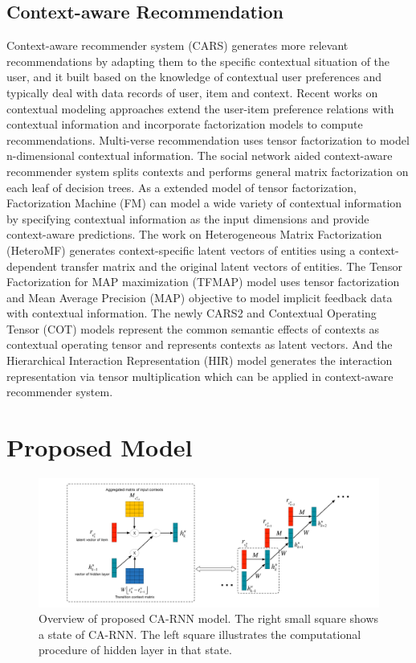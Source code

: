 \documentclass[conference]{IEEEtran}
\begin{document}
\subsection{Context-aware Recommendation}
Context-aware recommender system (CARS) \cite{adomavicius2011context} generates more relevant recommendations by adapting them to the specific contextual situation of the user, and it built based on the knowledge of contextual user preferences and typically deal with data records of user, item and context. Recent works on contextual modeling approaches extend the user-item preference relations with contextual information and incorporate factorization models to compute recommendations. Multi-verse recommendation \cite{karatzoglou2010multiverse} uses tensor factorization to model n-dimensional contextual information. The social network aided context-aware recommender system \cite{liu2013soco} splits contexts and performs general matrix factorization on each leaf of decision trees. As a extended model of tensor factorization, Factorization Machine (FM) \cite{rendle2011fast} can model a wide variety of contextual information by specifying contextual information as the input dimensions and provide context-aware predictions. The work on Heterogeneous Matrix Factorization (HeteroMF) \cite{jamali2013heteromf} generates context-specific latent vectors of entities using a context-dependent transfer matrix and the original latent vectors of entities. The Tensor Factorization for MAP maximization (TFMAP) model \cite{shi2012tfmap} uses tensor factorization and Mean Average Precision (MAP) objective to model implicit feedback data with contextual information. The newly CARS2 \cite{shi2014cars} and Contextual Operating Tensor (COT) \cite{liu2015cot} models represent the common semantic effects of contexts as contextual operating tensor and represents contexts as latent vectors. And the Hierarchical Interaction Representation (HIR) model \cite{liu2015collaborative} generates the interaction representation via tensor multiplication which can be applied in context-aware recommender system.

\section{Proposed Model}
\begin{figure}[htb]
\centering
\includegraphics[width=1\linewidth]{./model.pdf}
\caption{Overview of proposed CA-RNN model. The right small square shows a state of CA-RNN. The left square illustrates the computational procedure of hidden layer in that state.}
\label{fig:Model-overview}
\end{figure}
\end{document}
